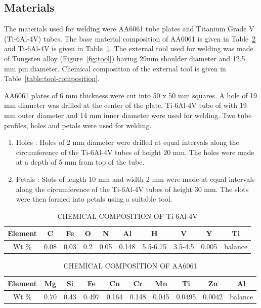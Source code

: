 \documentclass[3p]{elsarticle}
\begin{document}
\subsection{Materials}
\label{subsec:Materials}
The materials used for welding were AA6061 tube plates and Titanium Grade V (Ti-6Al-4V) tubes. The base material composition of AA6061 is given in Table~\ref{table:AA6061-composition} and Ti-6Al-4V is given in Table~\ref{table:Ti-6Al-4V-composition}. The external tool used for welding was made of Tungsten alloy (Figure~\ref{fig:tool}) having 29mm shoulder diameter and 12.5 mm pin diameter. Chemical composition of the external tool is given in Table~\ref{table:tool-composition}. 
\par 
AA6061 plates of 6 mm thickness were cut into 50 x 50 mm squares. A hole of 19 mm diameter was drilled at the center of the plate. Ti-6Al-4V tube of with 19 mm outer diameter and 14 mm inner diameter were used for welding. Two tube profiles, holes and petals were used for welding.
\begin{enumerate}[1.]
\item Holes : Holes of 2 mm diameter were drilled at equal intervals along the circumference of the Ti-6Al-4V tubes of height 20 mm. The holes were made at a depth of 5 mm from top of the tube.
\item Petals : Slots of length 10 mm and width 2 mm were made at equal intervals along the circumference of the Ti-6Al-4V tubes of height 30 mm. The slots were then formed into petals using a suitable tool.
\end{enumerate}

\begin{table}[!htbp]
\caption{CHEMICAL COMPOSITION OF Ti-6Al-4V}
\centering
\begin{tabular}{|c|c|c|c|c|c|c|c|c|c|}
\hline 
Element & C & Fe & O & N & Al & H & V & Y & Ti\\ 
\hline 
Wt \% & 0.08 & 0.03 & 0.2 & 0.05 & 0.148 & 5.5-6.75 & 3.5-4.5 & 0.005 & balance\\ 
\hline 
\end{tabular}
\label{table:Ti-6Al-4V-composition} %
\end{table}


\begin{table}[!htbp]
\caption{CHEMICAL COMPOSITION OF AA6061}
\centering
\begin{tabular}{|c|c|c|c|c|c|c|c|c|c|}
\hline 
Element & Mg & Si & Fe & Cu & Cr & Mn & Ti & Zn & Al\\ 
\hline 
Wt \% & 0.70 & 0.43 & 0.497 & 0.164 & 0.148 & 0.045 & 0.0495 & 0.0042 & balance\\ 
\hline 
\end{tabular}
\label{table:AA6061-composition} %
\end{table}
\end{document}
